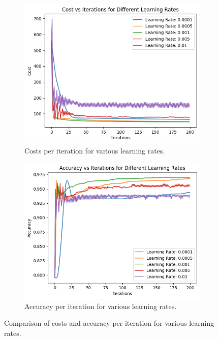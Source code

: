\documentclass[a4paper]{article}
\begin{document}
\begin{figure}[htbp]
    \centering
    \begin{subfigure}[b]{0.49\linewidth}
        \centering
        \includegraphics[width=\linewidth]{1.21.png}
        \caption{\centering Costs per iteration for various learning rates.}
    \end{subfigure}
    \hfill
    \begin{subfigure}[b]{0.49\linewidth}
        \centering
        \includegraphics[width=\linewidth]{1.22.png}
        \caption{\centering Accuracy per iteration for various learning rates.}
    \end{subfigure}
    \caption{\centering Comparison of costs and accuracy per iteration for various learning rates.}
\end{figure}
\end{document}
